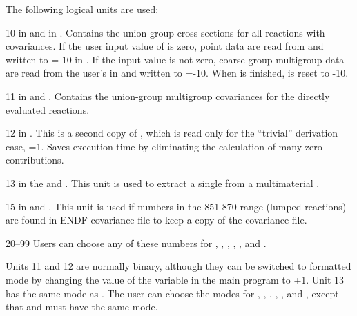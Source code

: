 The following logical units are used:

\begin{description}
\begin{singlespace}

\item[10]    in  and  in .
Contains the union group cross sections for all reactions with
covariances.  If the user input value of  is zero, point
data are read from  and written to =-10 in
.  If the input value  is not zero, coarse
group multigroup data are read from the user's  in
 and written to =-10.  When  is
finished,  is reset to -10.

 \item[11]    in  and .
Contains the union-group multigroup covariances for the
directly evaluated reactions.

\item[12]    in .  This is a second copy
of , which is read only for the ``trivial'' derivation
case, =1.  Saves execution time by eliminating the
calculation of many zero contributions.

\item[13]   in the  and .
This unit is used to extract a single  from a multimaterial
.

\item[15]   in  and .
This unit is used if  numbers in the 851-870 range (lumped reactions)
are found in ENDF covariance file to keep a copy of the covariance file.

\item[20--99]   Users can choose any of these numbers for
, , , ,
, and .

\end{singlespace}
\end{description}

\noindent
Units 11 and 12 are normally binary, although they can be switched to
formatted mode by changing the value of the variable  in the main
program to +1.  Unit 13 has the same mode as .  The user
can choose the modes for , , ,
, , and , except that 
and  must have the same mode.

\cleardoublepage

